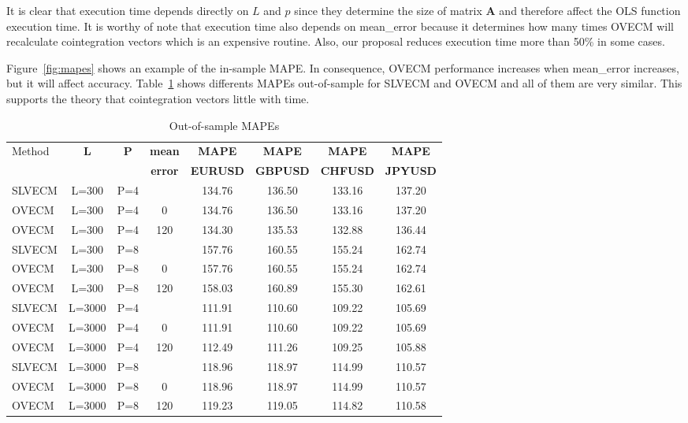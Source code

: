 It is clear that execution time depends directly on $L$ and $p$ since they
determine the size of matrix $\mathbf{A}$ and therefore affect the OLS function
execution time.
It is worthy of note that execution time also depends on mean\_error because it
determines how many times OVECM will recalculate cointegration vectors which is
an expensive routine. Also, our proposal reduces execution time more than  50\%
in some cases.

Figure~\ref{fig:mapes} shows an example of the
in-sample MAPE. In consequence, OVECM performance increases when
mean\_error increases, but it will affect accuracy. Table~\ref{tab:mapes} shows
differents MAPEs out-of-sample for SLVECM and OVECM and all of them are very
similar. This supports the theory that cointegration vectors little with time.

\begin{table}[ht!]
\caption{Out-of-sample MAPEs}
\label{tab:mapes}
\begin{center}
\begin{tabular}{|l|c|c|c|c|c|c|c|}
\hline
Method & \textbf{L} & \textbf{P} & \textbf{mean}  & \textbf{MAPE} & \textbf{MAPE}& \textbf{MAPE}& \textbf{MAPE}\\
&  &  & \textbf{error}  & \textbf{EURUSD} & \textbf{GBPUSD}& \textbf{CHFUSD}& \textbf{JPYUSD}\\
\hline
 SLVECM &   L=300 &  P=4&    &  134.76&  136.50&  133.16&  137.20\\
 OVECM  &   L=300 &  P=4& 0  &  134.76&  136.50&  133.16&  137.20\\
 OVECM  &   L=300 &  P=4& 120&  134.30&  135.53&  132.88&  136.44\\
\hline
 SLVECM &   L=300 &  P=8&    &  157.76&  160.55&  155.24&  162.74\\
 OVECM  &   L=300 &  P=8& 0  &  157.76&  160.55&  155.24&  162.74\\
 OVECM  &   L=300 &  P=8& 120&  158.03&  160.89&  155.30&  162.61\\
\hline
 SLVECM &   L=3000&  P=4&    &  111.91&  110.60&  109.22&  105.69\\
 OVECM  &   L=3000&  P=4& 0  &  111.91&  110.60&  109.22&  105.69\\
 OVECM  &   L=3000&  P=4& 120&  112.49&  111.26&  109.25&  105.88\\
\hline
 SLVECM &   L=3000&  P=8&    &  118.96&  118.97&  114.99&  110.57\\
 OVECM  &   L=3000&  P=8& 0  &  118.96&  118.97&  114.99&  110.57\\
 OVECM  &   L=3000&  P=8& 120&  119.23&  119.05&  114.82&  110.58\\
\hline
\end{tabular}
\end{center}
\end{table}


